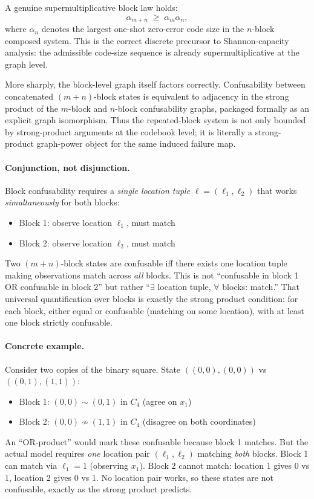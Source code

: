 A genuine supermultiplicative block law holds:
\[
\alpha_{m+n}\;\ge\;\alpha_m\alpha_n,
\]
where $\alpha_n$ denotes the largest one-shot zero-error code size in the $n$-block composed system. This is the correct discrete precursor to Shannon-capacity analysis: the admissible code-size sequence is already supermultiplicative at the graph level.

More sharply, the block-level graph itself factors correctly. Confusability between concatenated $(m+n)$-block states is equivalent to adjacency in the strong product of the $m$-block and $n$-block confusability graphs, packaged formally as an explicit graph isomorphism. Thus the repeated-block system is not only bounded by strong-product arguments at the codebook level; it is literally a strong-product graph-power object for the same induced failure map.

\paragraph{Conjunction, not disjunction.}
Block confusability requires a \emph{single location tuple} $\ell = (\ell_1, \ell_2)$ that works \emph{simultaneously} for both blocks:
\begin{itemize}
\item Block 1: observe location $\ell_1$, must match
\item Block 2: observe location $\ell_2$, must match
\end{itemize}
Two $(m+n)$-block states are confusable iff there exists one location tuple making observations match across \emph{all} blocks. This is not ``confusable in block 1 OR confusable in block 2'' but rather ``$\exists$ location tuple, $\forall$ blocks: match.'' That universal quantification over blocks is exactly the strong product condition: for each block, either equal or confusable (matching on some location), with at least one block strictly confusable.

\paragraph{Concrete example.}
Consider two copies of the binary square. State $((0,0), (0,0))$ vs $((0,1), (1,1))$:
\begin{itemize}
\item Block 1: $(0,0) \sim (0,1)$ in $C_4$ (agree on $x_1$)
\item Block 2: $(0,0) \not\sim (1,1)$ in $C_4$ (disagree on both coordinates)
\end{itemize}
An ``OR-product'' would mark these confusable because block 1 matches. But the actual model requires \emph{one} location pair $(\ell_1, \ell_2)$ matching \emph{both} blocks. Block 1 can match via $\ell_1 = 1$ (observing $x_1$). Block 2 cannot match: location 1 gives $0$ vs $1$, location 2 gives $0$ vs $1$. No location pair works, so these states are not confusable, exactly as the strong product predicts.

